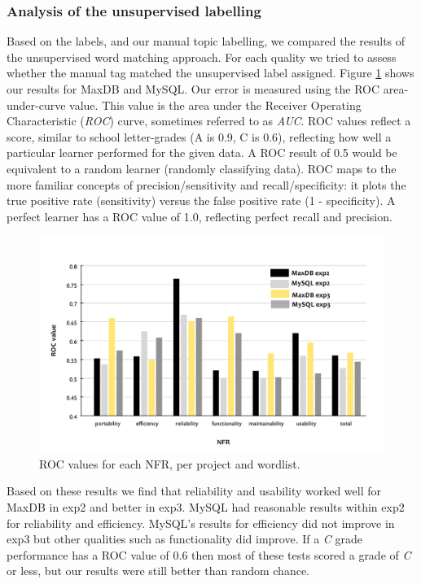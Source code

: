 \documentclass[]{sig-alternate}
\begin{document}
\subsubsection{Analysis of the unsupervised labelling}

\label{sec:unsuplabelling}

Based on the labels, and our manual topic labelling, we compared the results of the unsupervised word matching approach. For each quality we tried to assess whether the manual tag matched the unsupervised label assigned. Figure \ref{fig:maxdb-unsup-results} shows our results for MaxDB and MySQL. Our error is measured using the ROC area-under-curve value. This value is the area under the Receiver Operating Characteristic (\emph{ROC}) curve, sometimes referred to as \emph{AUC}. ROC values reflect a score, similar to school letter-grades (A is 0.9, C is 0.6), reflecting how well a particular learner performed for the given data. A ROC result of 0.5 would be equivalent to a random learner (randomly classifying data). ROC maps to the more familiar concepts of precision/sensitivity and recall/specificity: it plots the true positive rate (sensitivity) versus the false positive rate (1 - specificity). A perfect learner has a ROC value of 1.0, reflecting perfect recall and precision.

\begin{figure}
  \centering
 \includegraphics[width=.55\textwidth]{unsupervised-bar}
 \caption{ROC values for each NFR, per project and wordlist.}
  \label{fig:maxdb-unsup-results}
\end{figure}


Based on these results we find that reliability and usability worked well for MaxDB in \textsf{exp2} and better in \textsf{exp3}. MySQL had reasonable results within \textsf{exp2} for reliability and efficiency. MySQL's results for efficiency did not improve in \textsf{exp3} but other qualities such as functionality did improve. If a \emph{C} grade performance has a ROC value of $0.6$ then most of these tests scored a grade of \emph{C} or less, but our results were still better than random chance.
\end{document}
